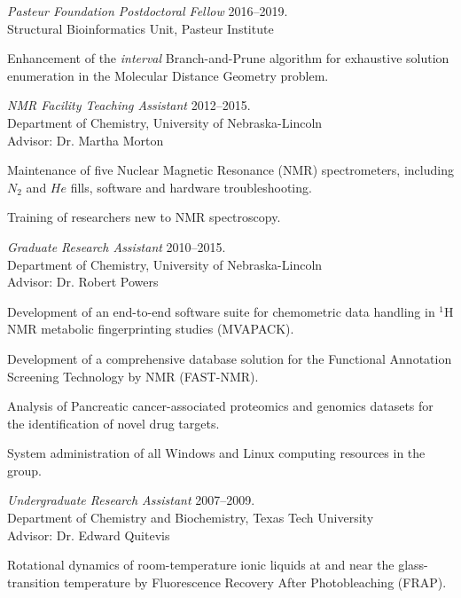\documentclass[letterpaper]{article}
\renewenvironment{itemize}{
  \begin{list}{}{
    \setlength{\leftmargin}{1.5em}
  }
}{
  \end{list}
}
\begin{document}
\begin{itemize}
\setlength{\itemsep}{16pt}
\item{
  {\it Pasteur Foundation Postdoctoral Fellow}
  \hfill 2016--2019. \\
  Structural Bioinformatics Unit, Pasteur Institute \\
  \begin{enumerate*}
    \item Enhancement of the {\it interval} Branch-and-Prune algorithm
    for exhaustive solution enumeration in the Molecular Distance
    Geometry problem.
  \end{enumerate*}
}

\item{
  {\it NMR Facility Teaching Assistant}
  \hfill 2012--2015. \\
  Department of Chemistry, University of Nebraska-Lincoln \\
  Advisor: Dr. Martha Morton
  \begin{enumerate*}
    \item Maintenance of five Nuclear Magnetic Resonance (NMR) spectrometers,
      including $N_2$ and $He$ fills, software and hardware troubleshooting.
    \item Training of researchers new to NMR spectroscopy.
  \end{enumerate*}
}

\item{
  {\it Graduate Research Assistant}
  \hfill 2010--2015. \\
  Department of Chemistry, University of Nebraska-Lincoln \\
  Advisor: Dr. Robert Powers
  \begin{enumerate*}
    \item Development of an end-to-end software suite for chemometric data
      handling in $^1$H NMR metabolic fingerprinting studies (MVAPACK).
    \item Development of a comprehensive database solution for the Functional
      Annotation Screening Technology by NMR (FAST-NMR).
    \item Analysis of Pancreatic cancer-associated proteomics and genomics
      datasets for the identification of novel drug targets.
    \item System administration of all Windows and Linux computing resources
      in the group.
  \end{enumerate*}
}

\item{
  {\it Undergraduate Research Assistant}
  \hfill 2007--2009. \\
  Department of Chemistry and Biochemistry, Texas Tech University \\
  {\setlength{\topmargin}{0pt} Advisor: Dr. Edward Quitevis}
  \begin{enumerate*}
    \item Rotational dynamics of room-temperature ionic liquids at and near
      the glass-transition temperature by Fluorescence Recovery After
      Photobleaching (FRAP).
  \end{enumerate*}
}
\end{itemize}
\end{document}
